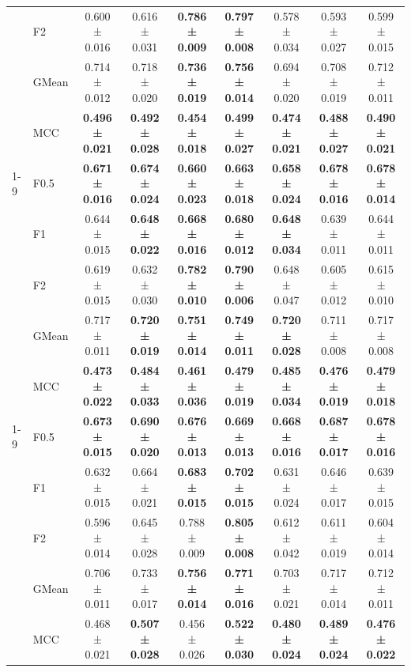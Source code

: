 \begin{table}[H]
{\begin{tabular}{llccccccc}
 & F2 & 0.600 ± 0.016 & 0.616 ± 0.031 & \textbf{0.786 ± 0.009} & \textbf{0.797 ± 0.008} & 0.578 ± 0.034 & 0.593 ± 0.027 & 0.599 ± 0.015 \\
 & GMean & 0.714 ± 0.012 & 0.718 ± 0.020 & \textbf{0.736 ± 0.019} & \textbf{0.756 ± 0.014} & 0.694 ± 0.020 & 0.708 ± 0.019 & 0.712 ± 0.011 \\
 & MCC & \textbf{0.496 ± 0.021} & \textbf{0.492 ± 0.028} & \textbf{0.454 ± 0.018} & \textbf{0.499 ± 0.027} & \textbf{0.474 ± 0.021} & \textbf{0.488 ± 0.027} & \textbf{0.490 ± 0.021} \\
\cline{1-9}
\multirow[t]{5}{*}{RandomForest} & F0.5 & \textbf{0.671 ± 0.016} & \textbf{0.674 ± 0.024} & \textbf{0.660 ± 0.023} & \textbf{0.663 ± 0.018} & \textbf{0.658 ± 0.024} & \textbf{0.678 ± 0.016} & \textbf{0.678 ± 0.014} \\
 & F1 & 0.644 ± 0.015 & \textbf{0.648 ± 0.022} & \textbf{0.668 ± 0.016} & \textbf{0.680 ± 0.012} & \textbf{0.648 ± 0.034} & 0.639 ± 0.011 & 0.644 ± 0.011 \\
 & F2 & 0.619 ± 0.015 & 0.632 ± 0.030 & \textbf{0.782 ± 0.010} & \textbf{0.790 ± 0.006} & 0.648 ± 0.047 & 0.605 ± 0.012 & 0.615 ± 0.010 \\
 & GMean & 0.717 ± 0.011 & \textbf{0.720 ± 0.019} & \textbf{0.751 ± 0.014} & \textbf{0.749 ± 0.011} & \textbf{0.720 ± 0.028} & 0.711 ± 0.008 & 0.717 ± 0.008 \\
 & MCC & \textbf{0.473 ± 0.022} & \textbf{0.484 ± 0.033} & \textbf{0.461 ± 0.036} & \textbf{0.479 ± 0.019} & \textbf{0.485 ± 0.034} & \textbf{0.476 ± 0.019} & \textbf{0.479 ± 0.018} \\
\cline{1-9}
\multirow[t]{5}{*}{TabICL} & F0.5 & \textbf{0.673 ± 0.015} & \textbf{0.690 ± 0.020} & \textbf{0.676 ± 0.013} & \textbf{0.669 ± 0.013} & \textbf{0.668 ± 0.016} & \textbf{0.687 ± 0.017} & \textbf{0.678 ± 0.016} \\
 & F1 & 0.632 ± 0.015 & 0.664 ± 0.021 & \textbf{0.683 ± 0.015} & \textbf{0.702 ± 0.015} & 0.631 ± 0.024 & 0.646 ± 0.017 & 0.639 ± 0.015 \\
 & F2 & 0.596 ± 0.014 & 0.645 ± 0.028 & 0.788 ± 0.009 & \textbf{0.805 ± 0.008} & 0.612 ± 0.042 & 0.611 ± 0.019 & 0.604 ± 0.014 \\
 & GMean & 0.706 ± 0.011 & 0.733 ± 0.017 & \textbf{0.756 ± 0.014} & \textbf{0.771 ± 0.016} & 0.703 ± 0.021 & 0.717 ± 0.014 & 0.712 ± 0.011 \\
 & MCC & 0.468 ± 0.021 & \textbf{0.507 ± 0.028} & 0.456 ± 0.026 & \textbf{0.522 ± 0.030} & \textbf{0.480 ± 0.024} & \textbf{0.489 ± 0.024} & \textbf{0.476 ± 0.022} \\

\end{tabular}}
\end{table}
